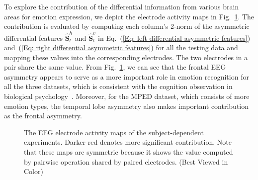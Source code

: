 \documentclass[journal]{IEEEtran}
\begin{document}
To explore the contribution of the differential information from various brain areas for emotion expression, we depict the electrode activity maps in Fig.~\ref{Fig: The EEG electrode activity maps}. The contribution is evaluated by computing each column's 2-norm of the asymmetric differential features $\hat{\mathbf{S}}_t^h$ and $\hat{\mathbf{S}}_t^v$ in Eq.~(\ref{Eq: left differential asymmetric features}) and~(\ref{Eq: right differential asymmetric features}) for all the testing data and mapping these values into the corresponding electrodes. The two electrodes in a pair share the same value. From Fig.~\ref{Fig: The EEG electrode activity maps}, we can see that the frontal EEG asymmetry appears to serve as a more important role in emotion recognition for all the three datasets, which is consistent with the cognition observation in biological psychology~\cite{coan2004frontal}. Moreover, for the MPED dataset, which consists of more emotion types, the temporal lobe asymmetry also makes important contribution as the frontal asymmetry. 
\begin{figure}[htb]
	\centering
	\hspace{0.7cm}
	\hspace{0.7cm}
	\caption{The EEG electrode activity maps of the subject-dependent experiments. Darker red denotes more significant contribution. Note that these maps are symmetric because it shows the value computed by pairwise operation shared by paired electrodes. (Best Viewed in Color)}
	\label{Fig: The EEG electrode activity maps}
\end{figure}
\end{document}
